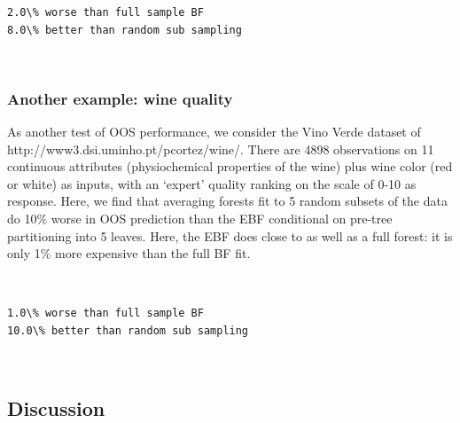 \documentclass[12pt]{article}
\begin{document}
    \begin{verbatim}
2.0\% worse than full sample BF
8.0\% better than random sub sampling
    \end{verbatim}

    \begin{center}
    \end{center}
    { \hspace*{\fill} \\}
    
    \subsubsection{Another example: wine
quality}\label{another-example-wine-quality}

As another test of OOS performance, we consider the Vino Verde dataset
of http://www3.dsi.uminho.pt/pcortez/wine/. There are 4898 observations
on 11 continuous attributes (physiochemical properties of the wine) plus
wine color (red or white) as inputs, with an `expert' quality ranking on
the scale of 0-10 as response. Here, we find that averaging forests fit
to 5 random subsets of the data do 10\% worse in OOS prediction than the
EBF conditional on pre-tree partitioning into 5 leaves. Here, the EBF
does close to as well as a full forest: it is only 1\% more expensive
than the full BF fit.

       
    \begin{center}
    \end{center}
    { \hspace*{\fill} \\}

    \begin{verbatim}
1.0\% worse than full sample BF
10.0\% better than random sub sampling
    \end{verbatim}

    \begin{center}
    \end{center}
    { \hspace*{\fill} \\}
    
    \subsection{Discussion}\label{discussion}
\end{document}
